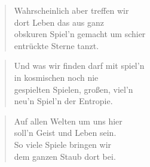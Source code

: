 \documentclass[10pt,a4paper]{article}
\begin{document}
\begin{multicols}{2}
\begin{verse}
Wahrscheinlich aber treffen wir \\
dort Leben das aus ganz \\
obskuren Spiel’n gemacht um schier \\
entrückte Sterne tanzt. \\
\end{verse}

\begin{verse}
Und was wir finden darf mit spiel’n \\
in kosmischen noch nie \\
gespielten Spielen, großen, viel’n \\
neu’n Spiel’n der Entropie. \\
\end{verse}

\begin{verse}
Auf allen Welten um uns hier \\
soll’n Geist und Leben sein. \\
So viele Spiele bringen wir \\
dem ganzen Staub dort bei. \\
\end{verse}

\end{multicols}
\end{document}
